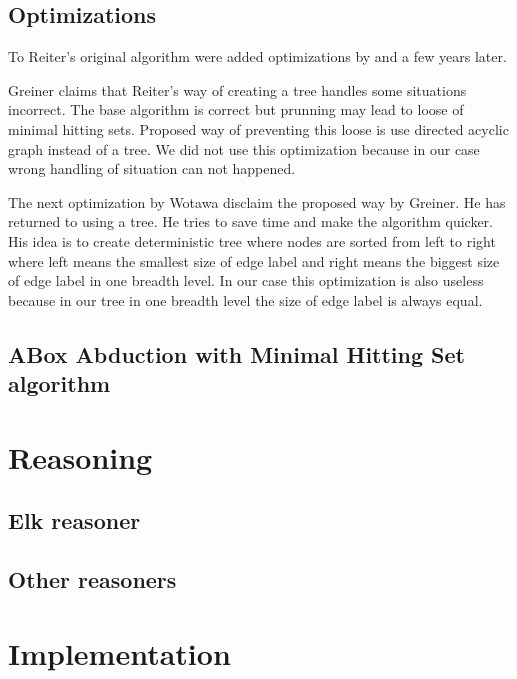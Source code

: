 \documentclass[12pt,a4paper]{article}
\begin{document}
\subsection{Optimizations}
To Reiter's original algorithm were added optimizations by \citep{greinerReitersCorrection} and \citep{wotawaReitersVariant} a few years later. 

Greiner claims that Reiter's way of creating a tree handles some situations incorrect. The base algorithm is correct but prunning may lead to loose of minimal hitting sets. Proposed way of preventing this loose is use directed acyclic graph instead of a tree. We did not use this optimization because in our case wrong handling of situation can not happened.

The next optimization by Wotawa disclaim the proposed way by Greiner. He has returned to using a tree. He tries to save time and make the algorithm quicker. His idea is to create deterministic tree where nodes are sorted from left to right where left means the smallest size of edge label and right means the biggest size of edge label in one breadth level. In our case this optimization is also useless because in our tree in one breadth level the size of edge label is always equal.

\subsection{ABox Abduction with Minimal Hitting Set algorithm}



\section{Reasoning}

\subsection{Elk reasoner}

\subsection{Other reasoners}

\section{Implementation}
\end{document}
